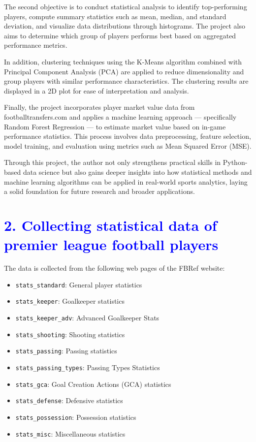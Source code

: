 \documentclass[a4paper,12pt]{article}
\begin{document}
The second objective is to conduct statistical analysis to identify top-performing players, compute summary statistics such as mean, median, and standard deviation, and visualize data distributions through histograms. The project also aims to determine which group of players performs best based on aggregated performance metrics.

In addition, clustering techniques using the K-Means algorithm combined with Principal Component Analysis (PCA) are applied to reduce dimensionality and group players with similar performance characteristics. The clustering results are displayed in a 2D plot for ease of interpretation and analysis.

Finally, the project incorporates player market value data from footballtransfers.com and applies a machine learning approach — specifically Random Forest Regression — to estimate market value based on in-game performance statistics. This process involves data preprocessing, feature selection, model training, and evaluation using metrics such as Mean Squared Error (MSE).

Through this project, the author not only strengthens practical skills in Python-based data science but also gains deeper insights into how statistical methods and machine learning algorithms can be applied in real-world sports analytics, laying a solid foundation for future research and broader applications.
\newpage
\section*{\textcolor{blue}{\Large 2. Collecting statistical data of premier league football players}}
The data is collected from the following web pages of the FBRef website:
\begin{itemize}
    \item \texttt{stats\_standard}: General player statistics
    \item \texttt{stats\_keeper}: Goalkeeper statistics
    \item \texttt{stats\_keeper\_adv}:
    Advanced Goalkeeper Stats
    \item \texttt{stats\_shooting}: Shooting statistics
    \item \texttt{stats\_passing}: Passing statistics
    \item \texttt{stats\_passing\_types}: Passing Types Statistics
    \item \texttt{stats\_gca}: Goal Creation Actions (GCA) statistics
    \item \texttt{stats\_defense}: Defensive statistics
    \item \texttt{stats\_possession}: Possession statistics
    \item \texttt{stats\_misc}: Miscellaneous statistics
\end{itemize}
\end{document}
